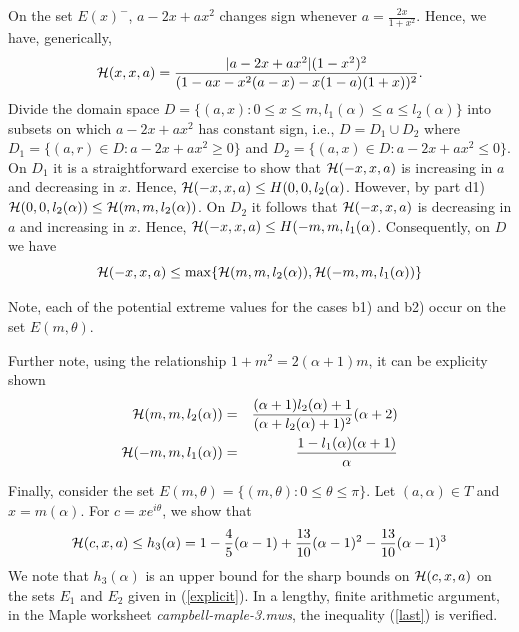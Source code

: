\documentclass[12pt]{article}
\begin{document}
\vspace{0.1in}

On the set $E(x)^{-}$, $a -2x + ax^2$ changes sign whenever $a = \frac{2x}{1+x^2}$.  Hence, we have,
generically, 
$$
{\cal H}(x,x,a) = \frac{|a-2x+ax^2|(1-x^2)^2}{( 1 - ax-x^2(a-x) - x(1-a)(1+x) )^2} .
$$
Divide the domain space $D = \{(a,x) : 0 \le x \le m, l_1(\alpha) \le a \le l_2(\alpha)\}$ into subsets on which $a -2x + ax^2$ has constant sign, i.e., $D = D_1 \cup D_2$ where $D_1 = \{ (a,r) \in D : a -2x + ax^2 \ge 0 \}$ and 
$D_2 = \{ (a,x) \in D : a -2x + ax^2 \le 0 \}$.  On $D_1$ it is a straightforward exercise to show that ${\cal H}(-x,x,a)$ is increasing in $a$ and decreasing in $x$.  Hence, ${\cal H}(-x,x,a) \le {\cal }H(0,0,l_2(\alpha)$.  However, by part d1) 
${\cal H}(0,0,l_2(\alpha)) \le {\cal H}(m,m,l_2(\alpha))$.  On $D_2$ it follows that ${\cal H}(-x,x,a)$ is decreasing in $a$ and increasing in $x$.  Hence, ${\cal H}(-x,x,a) \le {\cal }H(-m,m,l_1(\alpha)$.  Consequently, on $D$ we have
$$
{\cal H}(-x,x,a) \le \max \{{\cal H}(m,m,l_2(\alpha)),{\cal H}(-m,m,l_1(\alpha))\}
$$

Note, each of the potential extreme values for the cases b1) and b2) occur on the set $E(m,\theta)$.

Further note, using the relationship $1 + m^2 = 2(\alpha+1)m$, it can be explicity shown
\begin{eqnarray} \label{explicit}
{\cal H}(m,m,l_2(\alpha)) &=& \frac{(\alpha+1)l_2(\alpha)+1}{(\alpha+l_2(\alpha)+1)^2}(\alpha+2) \\
{\cal H}(-m,m,l_1(\alpha)) &=& \frac{1-l_1(\alpha)(\alpha+1)}{\alpha} \nonumber
\end{eqnarray}


Finally, consider the set $E(m,\theta) = \{(m,\theta) : 0 \le \theta \le \pi \}$. 
Let $(a,\alpha) \in T$ and $x = m(\alpha)$.  For $c = xe^{i\theta}$, we show that 
\begin{equation} \label{last}
{\cal H}(c,x,a) \le h_3(\alpha) = 1 - \frac{4}{5}(\alpha-1) + \frac{13}{10}(\alpha-1)^2 - \frac{13}{10}(\alpha-1)^3
\end{equation}  
We note that $h_3(\alpha)$ is an upper bound for the sharp bounds on ${\cal H}(c,x,a)$ on the sets $E_1$ and $E_2$ given in (\ref{explicit}). In a lengthy, finite arithmetic argument, in the Maple worksheet {\em campbell-maple-3.mws}, the inequality (\ref{last}) is verified.

\vspace{0.1in}
\end{document}
